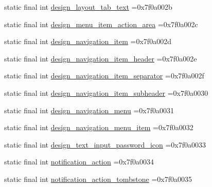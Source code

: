 \begin{DoxyCompactItemize}
\item 
static final int \mbox{\hyperlink{classcom_1_1example_1_1trainawearapplication_1_1_r_1_1layout_aaef2c76d6aaf0a6b5478827876a57f25}{design\+\_\+layout\+\_\+tab\+\_\+text}} =0x7f0a002b
\item 
static final int \mbox{\hyperlink{classcom_1_1example_1_1trainawearapplication_1_1_r_1_1layout_ae8940536f8e3fb12e4453bf817f0028f}{design\+\_\+menu\+\_\+item\+\_\+action\+\_\+area}} =0x7f0a002c
\item 
static final int \mbox{\hyperlink{classcom_1_1example_1_1trainawearapplication_1_1_r_1_1layout_a7d943031a6292b7babffebca1190b280}{design\+\_\+navigation\+\_\+item}} =0x7f0a002d
\item 
static final int \mbox{\hyperlink{classcom_1_1example_1_1trainawearapplication_1_1_r_1_1layout_a630f1e82a48e93d01f4cb495dcc9f2e5}{design\+\_\+navigation\+\_\+item\+\_\+header}} =0x7f0a002e
\item 
static final int \mbox{\hyperlink{classcom_1_1example_1_1trainawearapplication_1_1_r_1_1layout_a8e8fc3b188429106e89c1bdb9accc999}{design\+\_\+navigation\+\_\+item\+\_\+separator}} =0x7f0a002f
\item 
static final int \mbox{\hyperlink{classcom_1_1example_1_1trainawearapplication_1_1_r_1_1layout_accac7b5ff3e8df191dc653aba1d47866}{design\+\_\+navigation\+\_\+item\+\_\+subheader}} =0x7f0a0030
\item 
static final int \mbox{\hyperlink{classcom_1_1example_1_1trainawearapplication_1_1_r_1_1layout_ae24fc91144fcf0ad0c5789142b4e0545}{design\+\_\+navigation\+\_\+menu}} =0x7f0a0031
\item 
static final int \mbox{\hyperlink{classcom_1_1example_1_1trainawearapplication_1_1_r_1_1layout_a0181d448f8017036ff5d8f5a6a9391db}{design\+\_\+navigation\+\_\+menu\+\_\+item}} =0x7f0a0032
\item 
static final int \mbox{\hyperlink{classcom_1_1example_1_1trainawearapplication_1_1_r_1_1layout_a1d33b50ac72482089ee7d68fd27f4fa8}{design\+\_\+text\+\_\+input\+\_\+password\+\_\+icon}} =0x7f0a0033
\item 
static final int \mbox{\hyperlink{classcom_1_1example_1_1trainawearapplication_1_1_r_1_1layout_a7b91149cb9ebf8f0132deebc12cae6d9}{notification\+\_\+action}} =0x7f0a0034
\item 
static final int \mbox{\hyperlink{classcom_1_1example_1_1trainawearapplication_1_1_r_1_1layout_a3b3be9269ba20d917a741d1971b86757}{notification\+\_\+action\+\_\+tombstone}} =0x7f0a0035
\item 

\end{DoxyCompactItemize}
